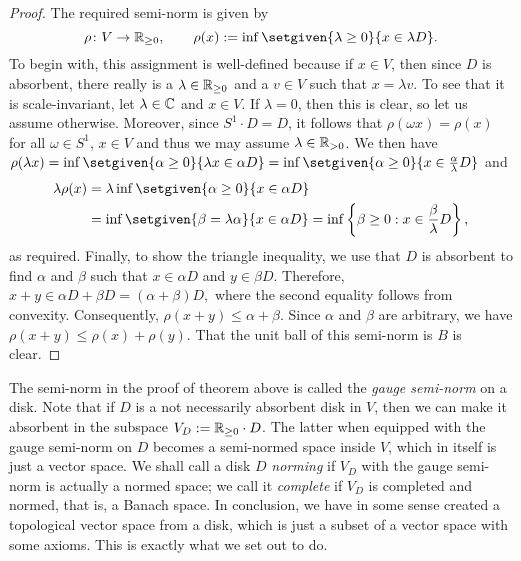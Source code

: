 \begin{proof}
    The required semi-norm is given by 
    \[\rho \colon V \to \R_{\geq 0}, \qquad \rho(x) \defeq \inf \setgiven{\lambda \geq 0}{x \in \lambda D}.\]
    To begin with, this assignment is well-defined because if \(x \in V\), then since \(D\) is absorbent, there really is a \(\lambda \in \mathbb R_{\geq 0}\) and a \(v \in V\) such that \(x = \lambda v\). To see that it is scale-invariant, let \(\lambda \in \mathbb C\) and \(x \in V\). If \(\lambda = 0\), then this is clear, so let us assume otherwise. 
    Moreover, since $S^1 \cdot D = D$, it follows that $\rho(\omega x) = \rho(x)$ for all $\omega \in S^1$, $x \in V$
    and thus we may assume $\lambda \in \mathbb R_{> 0}$.
    We then have \(\rho(\lambda x) = \inf \setgiven{\alpha \geq  0}{\lambda x \in \alpha D} = \inf \setgiven{\alpha \geq 0}{x \in \frac{\alpha}{\lambda} D }\) and
    \begin{align*}
        \lambda \rho(x) &= \lambda\inf \setgiven{\alpha \geq 0}{x \in \alpha D} \\
        & =\inf \setgiven{\beta = \lambda\alpha }{x \in \alpha D} = \inf\left\{\beta \ge 0 :  x \in \frac{\beta}{\lambda} D \right\},
    \end{align*} as required. Finally, to show the triangle inequality, we use that \(D\) is absorbent to find \(\alpha\) and \(\beta\) such that \(x \in \alpha D\) and \( y \in \beta D\). Therefore, \(x + y \in \alpha D + \beta D = (\alpha + \beta) D,\) where the second equality follows from convexity. Consequently, \(\rho(x + y) \leq \alpha + \beta\). Since \(\alpha\) and \(\beta\) are arbitrary, we have \(\rho(x+ y) \leq \rho(x) + \rho(y)\). That the unit ball of this semi-norm is \(B\) is clear.
\end{proof}

The semi-norm in the proof of theorem above is called the \emph{gauge semi-norm} on a disk. Note that if \(D\) is a not necessarily absorbent disk in \(V\), then we can make it absorbent in the subspace \(V_D \mathrel{:=} \mathbb R_{\geq 0} \cdot D\). The latter when equipped with the gauge semi-norm on \(D\) becomes a semi-normed space inside \(V\), which in itself is just a vector space. We shall call a disk \(D\) \emph{norming} if \(V_D\) with the gauge semi-norm is actually a normed space; we call it \emph{complete} if \(V_D\) is completed and normed, that is, a Banach space. In conclusion, we have in some sense created a topological vector space from a disk, which is just a subset of a vector space with some axioms. This is exactly what we set out to do.


